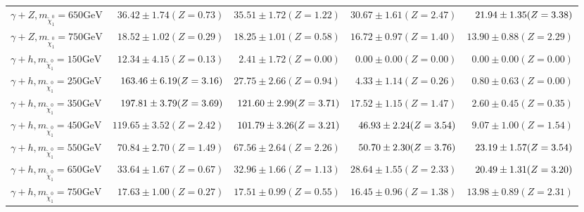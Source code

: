 \begin{tabular}{lrrrr}
$\gamma+Z, m_{\tilde{\chi}_{1}^{0}} = 650 \text{GeV}$ & $ 36.42 \pm 1.74 (Z=0.73)$ & $ 35.51 \pm 1.72 (Z=1.22)$ & $ 30.67 \pm 1.61 (Z=2.47)$ & $\cellcolor{lightgreen} 21.94 \pm 1.35 (Z=3.38)$ \\
$\gamma+Z, m_{\tilde{\chi}_{1}^{0}} = 750 \text{GeV}$ & $ 18.52 \pm 1.02 (Z=0.29)$ & $ 18.25 \pm 1.01 (Z=0.58)$ & $ 16.72 \pm 0.97 (Z=1.40)$ & $ 13.90 \pm 0.88 (Z=2.29)$ \\
\hline
$\gamma+h, m_{\tilde{\chi}_{1}^{0}} = 150 \text{GeV}$ & $ 12.34 \pm 4.15 (Z=0.13)$ & $ 2.41 \pm 1.72 (Z=0.00)$ & $ 0.00 \pm 0.00 (Z=0.00)$ & $ 0.00 \pm 0.00 (Z=0.00)$ \\
$\gamma+h, m_{\tilde{\chi}_{1}^{0}} = 250 \text{GeV}$ & $\cellcolor{lightgreen} 163.46 \pm 6.19 (Z=3.16)$ & $ 27.75 \pm 2.66 (Z=0.94)$ & $ 4.33 \pm 1.14 (Z=0.26)$ & $ 0.80 \pm 0.63 (Z=0.00)$ \\
$\gamma+h, m_{\tilde{\chi}_{1}^{0}} = 350 \text{GeV}$ & $\cellcolor{lightgreen} 197.81 \pm 3.79 (Z=3.69)$ & $\cellcolor{lightgreen} 121.60 \pm 2.99 (Z=3.71)$ & $ 17.52 \pm 1.15 (Z=1.47)$ & $ 2.60 \pm 0.45 (Z=0.35)$ \\
$\gamma+h, m_{\tilde{\chi}_{1}^{0}} = 450 \text{GeV}$ & $ 119.65 \pm 3.52 (Z=2.42)$ & $\cellcolor{lightgreen} 101.79 \pm 3.26 (Z=3.21)$ & $\cellcolor{lightgreen} 46.93 \pm 2.24 (Z=3.54)$ & $ 9.07 \pm 1.00 (Z=1.54)$ \\
$\gamma+h, m_{\tilde{\chi}_{1}^{0}} = 550 \text{GeV}$ & $ 70.84 \pm 2.70 (Z=1.49)$ & $ 67.56 \pm 2.64 (Z=2.26)$ & $\cellcolor{lightgreen} 50.70 \pm 2.30 (Z=3.76)$ & $\cellcolor{lightgreen} 23.19 \pm 1.57 (Z=3.54)$ \\
$\gamma+h, m_{\tilde{\chi}_{1}^{0}} = 650 \text{GeV}$ & $ 33.64 \pm 1.67 (Z=0.67)$ & $ 32.96 \pm 1.66 (Z=1.13)$ & $ 28.64 \pm 1.55 (Z=2.33)$ & $\cellcolor{lightgreen} 20.49 \pm 1.31 (Z=3.20)$ \\
$\gamma+h, m_{\tilde{\chi}_{1}^{0}} = 750 \text{GeV}$ & $ 17.63 \pm 1.00 (Z=0.27)$ & $ 17.51 \pm 0.99 (Z=0.55)$ & $ 16.45 \pm 0.96 (Z=1.38)$ & $ 13.98 \pm 0.89 (Z=2.31)$ \\
\hline
\end{tabular}
